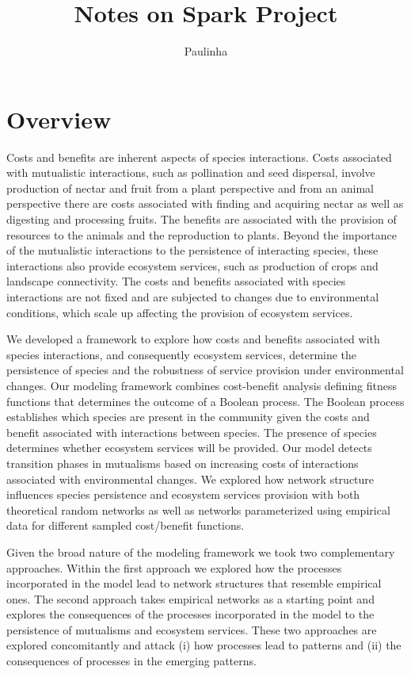 \documentclass[
  letterpaper,
  DIV=11,
  numbers=noendperiod]{scrartcl}
\title{Notes on Spark Project}
\author{Paulinha}
\date{}
\begin{document}
\maketitle


\section{Overview}\label{overview}

Costs and benefits are inherent aspects of species interactions. Costs
associated with mutualistic interactions, such as pollination and seed
dispersal, involve production of nectar and fruit from a plant
perspective and from an animal perspective there are costs associated
with finding and acquiring nectar as well as digesting and processing
fruits. The benefits are associated with the provision of resources to
the animals and the reproduction to plants. Beyond the importance of the
mutualistic interactions to the persistence of interacting species,
these interactions also provide ecosystem services, such as production
of crops and landscape connectivity. The costs and benefits associated
with species interactions are not fixed and are subjected to changes due
to environmental conditions, which scale up affecting the provision of
ecosystem services.

We developed a framework to explore how costs and benefits associated
with species interactions, and consequently ecosystem services,
determine the persistence of species and the robustness of service
provision under environmental changes. Our modeling framework combines
cost-benefit analysis defining fitness functions that determines the
outcome of a Boolean process. The Boolean process establishes which
species are present in the community given the costs and benefit
associated with interactions between species. The presence of species
determines whether ecosystem services will be provided. Our model
detects transition phases in mutualisms based on increasing costs of
interactions associated with environmental changes. We explored how
network structure influences species persistence and ecosystem services
provision with both theoretical random networks as well as networks
parameterized using empirical data for different sampled cost/benefit
functions.

Given the broad nature of the modeling framework we took two
complementary approaches. Within the first approach we explored how the
processes incorporated in the model lead to network structures that
resemble empirical ones. The second approach takes empirical networks as
a starting point and explores the consequences of the processes
incorporated in the model to the persistence of mutualisms and ecosystem
services. These two approaches are explored concomitantly and attack (i)
how processes lead to patterns and (ii) the consequences of processes in
the emerging patterns.
\end{document}
